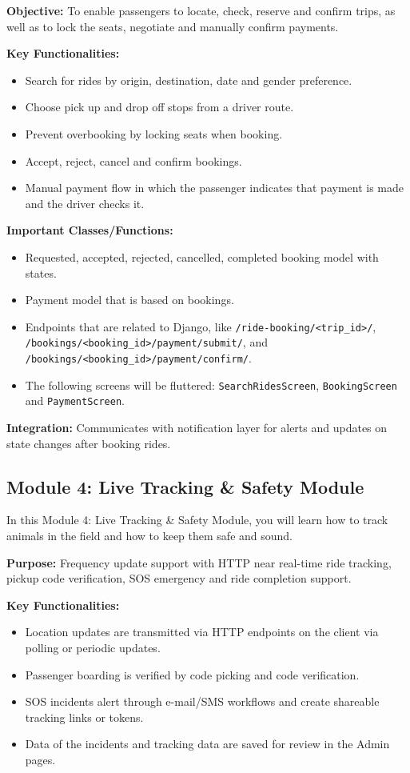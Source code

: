 \textbf{Objective:} To enable passengers to locate, check, reserve and confirm trips, as well as to lock the seats, negotiate and manually confirm payments.

\textbf{Key Functionalities:}
\begin{itemize}
    \item Search for rides by origin, destination, date and gender preference.
    \item Choose pick up and drop off stops from a driver route.
    \item Prevent overbooking by locking seats when booking.
    \item Accept, reject, cancel and confirm bookings.
    \item Manual payment flow in which the passenger indicates that payment is made and the driver checks it.
\end{itemize}

\textbf{Important Classes/Functions:}
\begin{itemize}
    \item Requested, accepted, rejected, cancelled, completed booking model with states.
    \item Payment model that is based on bookings.
    \item Endpoints that are related to Django, like \texttt{/ride-booking/<trip\_id>/}, \texttt{/bookings/<booking\_id>/payment/submit/}, and \texttt{/bookings/<booking\_id>/payment/confirm/}.
    \item The following screens will be fluttered: \texttt{SearchRidesScreen}, \texttt{BookingScreen} and \texttt{PaymentScreen}.
\end{itemize}

\textbf{Integration:} Communicates with notification layer for alerts and updates on state changes after booking rides.

\subsection{Module 4: Live Tracking \& Safety Module}

In this Module 4: Live Tracking \& Safety Module, you will learn how to track animals in the field and how to keep them safe and sound.

\textbf{Purpose:} Frequency update support with HTTP near real-time ride tracking, pickup code verification, SOS emergency and ride completion support.

\textbf{Key Functionalities:}
\begin{itemize}
    \item Location updates are transmitted via HTTP endpoints on the client via polling or periodic updates.
    \item Passenger boarding is verified by code picking and code verification.
    \item SOS incidents alert through e-mail/SMS workflows and create shareable tracking links or tokens.
    \item Data of the incidents and tracking data are saved for review in the Admin pages.
\end{itemize}


